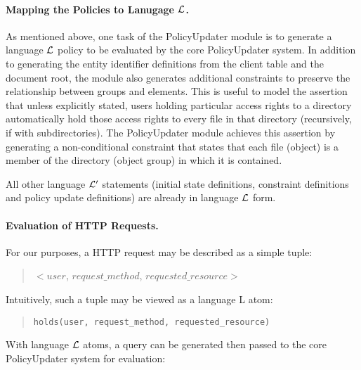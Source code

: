 \documentclass{llncs}
\begin{document}
      \paragraph{\bf Mapping the Policies to Lanugage ${\cal L}$.}

        As mentioned above, one task of the PolicyUpdater module is to generate
        a language ${\cal L}$ policy to be evaluated by the core PolicyUpdater
        system. In addition to generating the entity identifier definitions
        from the client table and the document root, the module also generates
        additional constraints to preserve the relationship between groups
        and elements. This is useful to model the assertion that unless
        explicitly stated, users holding particular access rights to a
        directory automatically hold those access rights to every file in
        that directory (recursively, if with subdirectories). The PolicyUpdater
        module achieves this assertion by generating a non-conditional
        constraint that states that each file (object) is a member of the
        directory (object group) in which it is contained.

        All other language ${\cal L'}$ statements (initial state definitions,
        constraint definitions and policy update definitions) are already in
        language ${\cal L}$ form.

      \paragraph{\bf Evaluation of HTTP Requests.}

        For our purposes, a HTTP request may be described as a simple tuple:

        \begin{quote}
          $<$$user$, $request\_method$, $requested\_resource$$>$
        \end{quote}

        Intuitively, such a tuple may be viewed as a language {\cal L} atom:

        \begin{quote}
        \begin{verbatim}holds(user, request_method, requested_resource)\end{verbatim}
        \end{quote}

        With language ${\cal L}$ atoms, a query can be generated then passed to
        the core PolicyUpdater system for evaluation:
\end{document}
